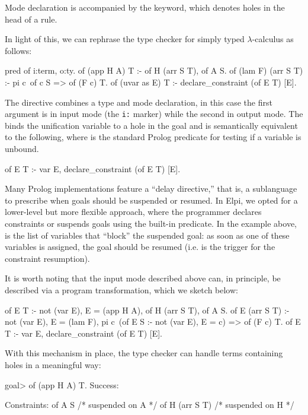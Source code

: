 \documentclass[a4paper, 11pt]{book}
\begin{document}
Mode declaration is accompanied by the  keyword, which denotes
holes in the head of a rule.

In light of this, we can rephrase the type checker for simply typed
$\lambda$-calculus as follows:

\begin{elpicode}
pred of i:term, o:ty.
of (app H A) T :- of H (arr S T), of A S.
of (lam F) (arr S T) :- pi c\ of c S => of (F c) T.
of (uvar as E) T :- declare_constraint (of E T) [E].
\end{elpicode}

The  directive combines a type and mode declaration,
in this case the first argument is in input mode (the \texttt{i:} marker)
while the second in output mode. The
 binds the unification variable  to a hole in the
goal and is semantically equivalent to the following, where  is
the standard Prolog predicate for testing if a variable is unbound.
\begin{elpicode}
of E T :- var E, declare_constraint (of E T) [E].
\end{elpicode}


Many Prolog implementations feature a ``delay directive,'' that is, a
sublanguage to prescribe when goals should be suspended or resumed. In Elpi,
we opted for a lower-level but more flexible approach, where the programmer
declares constraints or suspends goals using the 
built-in predicate. In the example above, \elpi{[E]} is the list of variables
that ``block'' the suspended goal: as soon as one of these variables is
assigned, the goal should be resumed (i.e.  is the trigger for
the constraint resumption).

It is worth noting that the input mode described above can, in principle, be
described via a program transformation, which we sketch below:

\begin{elpicode}
of E T :- not (var E), E = (app H A), of H (arr S T), of A S.
of E (arr S T) :- not (var E), E = (lam F),
  pi c\ (of E S :- not (var E), E = c) => of (F c) T.
of E T :- var E, declare_constraint (of E T) [E].
\end{elpicode}


With this mechanism in place, the type checker can handle terms containing
holes in a meaningful way:

\begin{elpicode}
goal> of (app H A) T.
Success:

Constraints:
  of A S  /* suspended on A */
  of H (arr S T)  /* suspended on H */
\end{elpicode}
\end{document}
